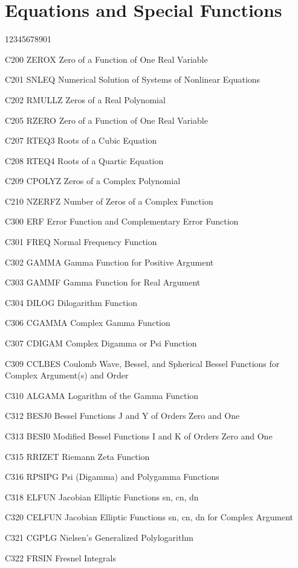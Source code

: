 \section*{Equations and Special Functions}
\begin{DLtt}{12345678901}
\item[C200 ZEROX] Zero of a Function of One Real Variable
\item[C201 SNLEQ] Numerical Solution of Systems of Nonlinear Equations
\item[C202 RMULLZ] Zeros of a Real Polynomial
\item[C205 RZERO] Zero of a Function of One Real Variable
\item[C207 RTEQ3] Roots of a Cubic Equation
\item[C208 RTEQ4] Roots of a Quartic Equation 
\item[C209 CPOLYZ] Zeros of a Complex Polynomial
\item[C210 NZERFZ] Number of Zeros of a Complex Function
\item[C300 ERF] Error Function and Complementary Error Function
\item[C301 FREQ] Normal Frequency Function
\item[C302 GAMMA] Gamma Function for Positive Argument
\item[C303 GAMMF] Gamma Function for Real Argument
\item[C304 DILOG] Dilogarithm Function
\item[C306 CGAMMA] Complex Gamma Function
\item[C307 CDIGAM] Complex Digamma or Psi Function
\item[C309 CCLBES] Coulomb Wave, Bessel, and Spherical Bessel Functions for Complex Argument(s) and Order
\item[C310 ALGAMA] Logarithm of the Gamma Function
\item[C312 BESJ0] Bessel Functions J and Y of Orders Zero and One 
\item[C313 BESI0] Modified Bessel Functions I and K of Orders Zero and One
\item[C315 RRIZET] Riemann Zeta Function
\item[C316 RPSIPG] Psi (Digamma) and Polygamma Functions
\item[C318 ELFUN] Jacobian Elliptic Functions sn, cn, dn
\item[C320 CELFUN] Jacobian Elliptic Functions sn, cn, dn for Complex Argument
\item[C321 CGPLG] Nielsen's Generalized Polylogarithm
\item[C322 FRSIN] Fresnel Integrals

\end{DLtt}

